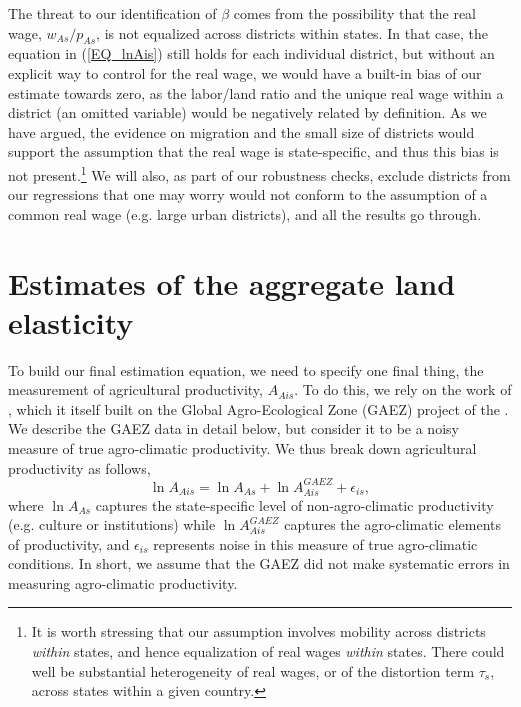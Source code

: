 \documentclass[11pt]{article}
\begin{document}
The threat to our identification of $\beta$ comes from the possibility that the real wage, $w_{As}/p_{As}$, is not equalized across districts within states. In that case, the equation in (\ref{EQ_lnAis}) still holds for each individual district, but without an explicit way to control for the real wage, we would have a built-in bias of our estimate towards zero, as the labor/land ratio and the unique real wage within a district (an omitted variable) would be negatively related by definition. As we have argued, the evidence on migration and the small size of districts would support the assumption that the real wage is state-specific, and thus this bias is not present.\footnote{It is worth stressing that our assumption involves mobility across districts \textit{within} states, and hence equalization of real wages \textit{within} states. There could well be substantial heterogeneity of real wages, or of the distortion term $\tau_s$, across states within a given country.} We will also, as part of our robustness checks, exclude districts from our regressions that one may worry would not conform to the assumption of a common real wage (e.g. large urban districts), and all the results go through.

\section{Estimates of the aggregate land elasticity}
To build our final estimation equation, we need to specify one final thing, the measurement of agricultural productivity, $A_{Ais}$. To do this, we rely on the work of \cite{galorozak2016}, which it itself built on the Global Agro-Ecological Zone (GAEZ) project of the \cite{gaez}. We describe the GAEZ data in detail below, but consider it to be a noisy measure of true agro-climatic productivity. We thus break down agricultural productivity as follows,
\begin{equation*}
	\ln A_{Ais} = \ln A_{As} + \ln A^{GAEZ}_{Ais} + \epsilon_{is},
\end{equation*}
where $\ln A_{As}$ captures the state-specific level of non-agro-climatic productivity (e.g. culture or institutions) while $\ln A^{GAEZ}_{Ais}$ captures the agro-climatic elements of productivity, and $\epsilon_{is}$ represents noise in this measure of true agro-climatic conditions. In short, we assume that the GAEZ did not make systematic errors in measuring agro-climatic productivity.
\end{document}

